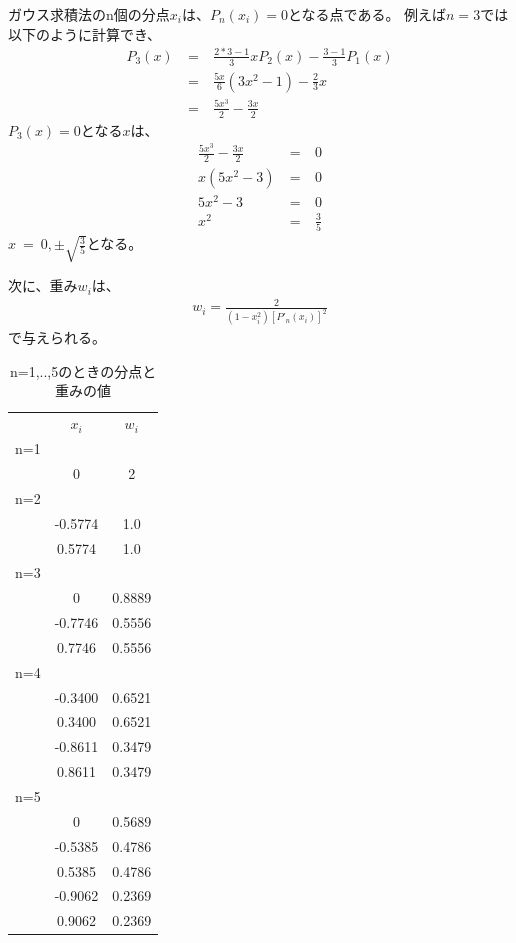 \documentclass[dvipdfmx]{jsarticle}
\begin{document}
ガウス求積法のn個の分点$x_i$は、$P_n(x_i)=0$となる点である。
例えば$n=3$では以下のように計算でき、
\begin{eqnarray}
  P_3(x)~&=&~\frac{2*3-1}{3}xP_2(x) - \frac{3-1}{3}P_1(x) \nonumber\\
  &=&~\frac{5x}{6}(3x^2-1)-\frac{2}{3}x \nonumber\\
  &=&~\frac{5 x^{3}}{2} - \frac{3 x}{2} \nonumber
\end{eqnarray}
$P_3(x)=0$となる$x$は、
\begin{eqnarray}
  \frac{5 x^{3}}{2} - \frac{3 x}{2} ~&=&~ 0 \nonumber\\
  x(5x^2-3) ~&=&~ 0 \nonumber\\
  5x^2-3 ~&=&~ 0 \nonumber\\
  x^2 ~&=&~ \frac{3}{5} \nonumber
\end{eqnarray}
$x~=~0,\pm{\sqrt{\frac{3}{5}}}$となる。

次に、重み$w_i$は、
\begin{eqnarray}
  w_i = \frac{2}{(1-x_i^2)[P'_n(x_i)]^2}
\end{eqnarray}
で与えられる。
\begin{table}[H]
  \begin{tabular}{ccc}
     & \emph{$x_i$} & \emph{$w_i$} \\
    n=1                            \\
     & 0            & 2            \\
    n=2                            \\
     & -0.5774      & 1.0          \\
     & 0.5774       & 1.0          \\
    n=3                            \\
     & 0            & 0.8889       \\
     & -0.7746      & 0.5556       \\
     & 0.7746       & 0.5556       \\
    n=4                            \\
     & -0.3400      & 0.6521       \\
     & 0.3400       & 0.6521       \\
     & -0.8611      & 0.3479       \\
     & 0.8611       & 0.3479       \\
    n=5                            \\
     & 0            & 0.5689       \\
     & -0.5385      & 0.4786       \\
     & 0.5385       & 0.4786       \\
     & -0.9062      & 0.2369       \\
     & 0.9062       & 0.2369
  \end{tabular}
  \centering
  \caption{n=1,..,5のときの分点と重みの値}
  \label{gauss_tbl1}
\end{table}
\end{document}
